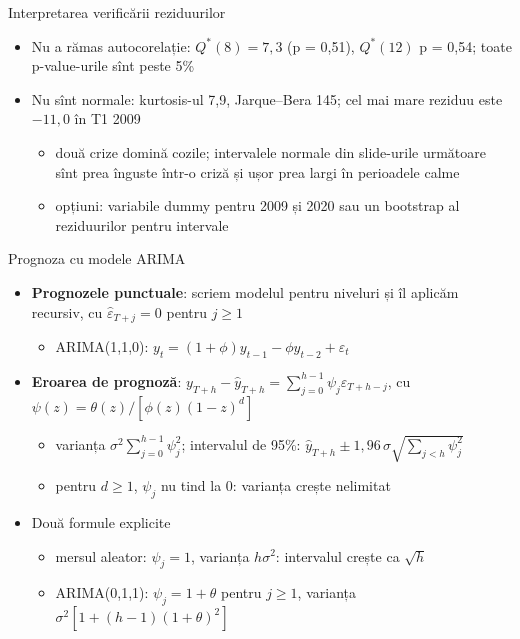 \begin{frame}{Interpretarea verificării reziduurilor}
\itemsize{\small}
\begin{itemize}
    \item Nu a rămas autocorelație: $Q^*(8) = 7{,}3$ (p = 0{,}51), $Q^*(12)$ p = 0{,}54; toate p-value-urile sînt peste 5\%
    \item Nu sînt normale: kurtosis-ul 7{,}9, Jarque--Bera 145; cel mai mare reziduu este $\ensuremath{-}11{,}0$ în T1 2009
    \begin{itemize}
        \item două crize domină cozile; intervalele normale din slide-urile următoare sînt prea înguste într-o criză și ușor prea largi în perioadele calme
        \item opțiuni: variabile dummy pentru 2009 și 2020 sau un bootstrap al reziduurilor pentru intervale
    \end{itemize}
\end{itemize}
\end{frame}

\begin{frame}{Prognoza cu modele ARIMA}
\itemsize{\small}
\begin{itemize}
    \item \textbf{Prognozele punctuale}: scriem modelul pentru niveluri și îl aplicăm recursiv, cu $\hat\varepsilon_{T+j} = 0$ pentru $j \ge 1$
    \begin{itemize}
        \item ARIMA(1,1,0): $y_t = (1 + \phi)y_{t-1} - \phi y_{t-2} + \varepsilon_t$
    \end{itemize}
    \item \textbf{Eroarea de prognoză}: $y_{T+h} - \hat y_{T+h} = \sum_{j=0}^{h-1}\psi_j\varepsilon_{T+h-j}$, cu $\psi(z) = \theta(z)/[\phi(z)(1 - z)^d]$
    \begin{itemize}
        \item varianța $\sigma^2\sum_{j=0}^{h-1}\psi_j^2$; intervalul de 95\%: $\hat y_{T+h} \pm 1{,}96\,\sigma\sqrt{\sum_{j<h}\psi_j^2}$
        \item pentru $d \ge 1$, $\psi_j$ nu tind la 0: varianța crește nelimitat
    \end{itemize}
    \item Două formule explicite
    \begin{itemize}
        \item mersul aleator: $\psi_j = 1$, varianța $h\sigma^2$: intervalul crește ca $\sqrt{h}$
        \item ARIMA(0,1,1): $\psi_j = 1 + \theta$ pentru $j \ge 1$, varianța $\sigma^2[1 + (h - 1)(1 + \theta)^2]$
    \end{itemize}
\end{itemize}
\end{frame}

